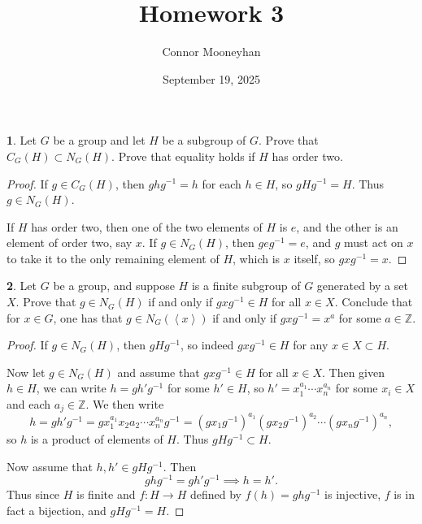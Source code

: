 \documentclass[12pt]{article}
\title{Homework 3}
\author{Connor Mooneyhan}
\date{September 19, 2025}
\theoremstyle{definition}
\newtheorem{ex}{}
\begin{document}
\maketitle

\begin{ex}
	Let $G$ be a group and let $H$ be a subgroup of $G$.
	Prove that $C_G(H) \subset N_G(H)$.
	Prove that equality holds if $H$ has order two.
\end{ex}
\begin{proof}
	If $g \in C_G(H)$, then $ghg^{-1} = h$ for each $h \in H$, so $gHg^{-1} = H$.
	Thus $g \in N_G(H)$.

	If $H$ has order two, then one of the two elements of $H$ is $e$, and the other is an element of order two, say $x$.
	If $g \in N_G(H)$, then $geg^{-1} = e$, and $g$ must act on $x$ to take it to the only remaining element of $H$, which is $x$ itself, so $gxg^{-1} = x$.
\end{proof}

\begin{ex}
	Let $G$ be a group, and suppose $H$ is a finite subgroup of $G$ generated by a set $X$.
	Prove that $g \in N_G(H)$ if and only if $gxg^{-1} \in H$ for all $x \in X$.
	Conclude that for $x \in G$, one has that $g \in N_G(\left\langle x \right\rangle)$ if and only if $gxg^{-1} = x^a$ for some $a \in \mathbb{Z}$.
\end{ex}
\begin{proof}
	If $g \in N_G(H)$, then $gHg^{-1}$, so indeed $gxg^{-1} \in H$ for any $x \in X \subset H$.

	Now let $g \in N_G(H)$ and assume that $gxg^{-1} \in H$ for all $x \in X$.
	Then given $h \in H$, we can write $h = gh' g^{-1}$ for some $h' \in H$, so $h' = x_1^{a_1} \cdots x_n^{a_n}$ for some $x_i \in X$ and each $a_j \in \mathbb{Z}$.
	We then write \begin{equation*}
		h = gh'g^{-1} = gx_1^{a_1}x_2{a_2}\cdots x_n^{a_n}g^{-1} = (gx_1g^{-1})^{a_1}(gx_2g^{-1})^{a_2}\cdots (gx_ng^{-1})^{a_n},
	\end{equation*}
	so $h$ is a product of elements of $H$.
	Thus $gHg^{-1} \subset H$.

	Now assume that $h, h' \in gHg^{-1}$.
	Then \begin{equation*}
		ghg^{-1} = gh'g^{-1} \implies h = h'.
	\end{equation*}
	Thus since $H$ is finite and $f: H \to H$ defined by $f(h) = ghg^{-1}$ is injective, $f$ is in fact a bijection, and $gHg^{-1} = H$.
\end{proof}
\end{document}

